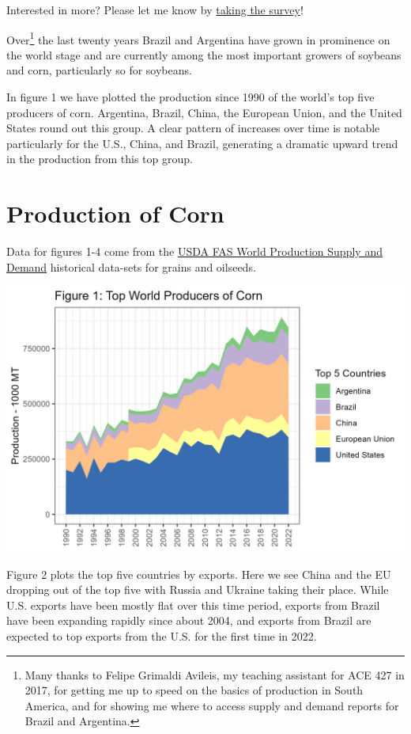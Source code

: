 \documentclass[
  letterpaper,
  DIV=11,
  numbers=noendperiod]{scrreprt}
\begin{document}
{Interested in more? Please let me know by}
\href{https://forms.gle/Q3VByCQZHjfQSy9D7}{taking the survey}!

Over\footnote{Many thanks to Felipe Grimaldi Avileis, my teaching
  assistant for ACE 427 in 2017, for getting me up to speed on the
  basics of production in South America, and for showing me where to
  access supply and demand reports for Brazil and Argentina.} the last
twenty years Brazil and Argentina have grown in prominence on the world
stage and are currently among the most important growers of soybeans and
corn, particularly so for soybeans.

In figure 1 we have plotted the production since 1990 of the world's top
five producers of corn. Argentina, Brazil, China, the European Union,
and the United States round out this group. A clear pattern of increases
over time is notable particularly for the U.S., China, and Brazil,
generating a dramatic upward trend in the production from this top
group.

\section{Production of Corn}\label{production-of-corn}

Data for figures 1-4 come from the
\href{https://apps.fas.usda.gov/psdonline/app/index.html\#/app/downloads}{USDA
FAS World Production Supply and Demand} historical data-sets for grains
and oilseeds.

\includegraphics{assets/SouthAmericanProduction_TopProdCorn.png}

Figure 2 plots the top five countries by exports. Here we see China and
the EU dropping out of the top five with Russia and Ukraine taking their
place. While U.S. exports have been mostly flat over this time period,
exports from Brazil have been expanding rapidly since about 2004, and
exports from Brazil are expected to top exports from the U.S. for the
first time in 2022.
\end{document}
